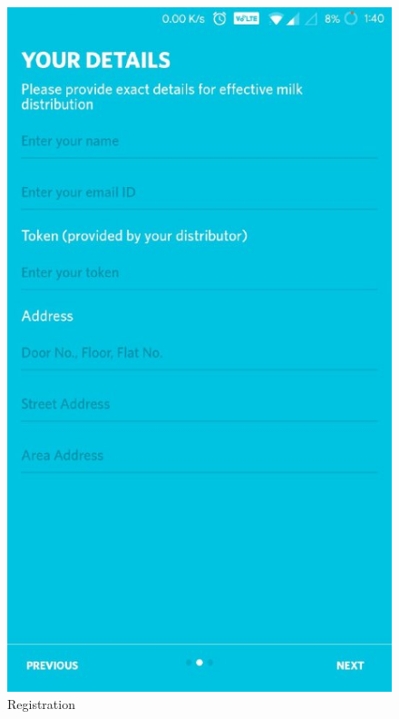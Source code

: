 \begin{figure}[h]
  \begin{center}
\includegraphics[scale=0.6]{3/three.jpeg}
\caption{Registration}
\label{fig:two}
\end{center}
\end{figure}

